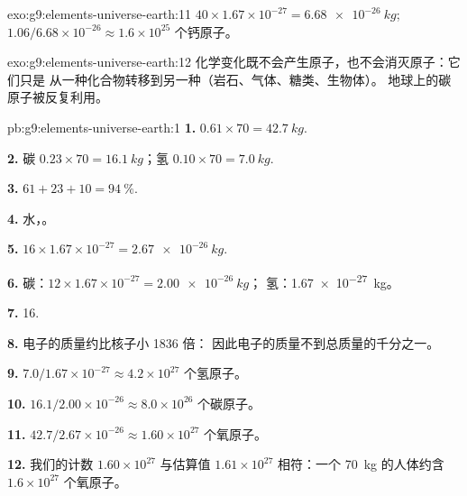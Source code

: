 \begin{solution}{exo:g9:elements-universe-earth:11}
$40 \times 1.67 \times 10^{-27} = \qty{6.68e-26}{kg}$;
$1.06 / 6.68 \times 10^{-26} \approx 1.6 \times 10^{25}$ 个钙原子。
\end{solution}

\begin{solution}{exo:g9:elements-universe-earth:12}
化学变化既不会产生原子，也不会消灭原子：它们只是
从一种化合物转移到另一种（岩石、气体、糖类、生物体）。
地球上的碳原子被反复利用。
\end{solution}

\begin{solution}{pb:g9:elements-universe-earth:1}
\textbf{1.} $0.61 \times 70 = \qty{42.7}{kg}$.

\textbf{2.} 碳 $0.23 \times 70 = \qty{16.1}{kg}$；氢
$0.10 \times 70 = \qty{7.0}{kg}$.

\textbf{3.} $61 + 23 + 10 = \qty{94}{\percent}$.

\textbf{4.} 水，。

\textbf{5.} $16 \times 1.67 \times 10^{-27} = \qty{2.67e-26}{kg}$.

\textbf{6.} 碳：$12 \times 1.67 \times 10^{-27} = \qty{2.00e-26}{kg}$；
氢：\qty{1.67e-27}{kg}。

\textbf{7.} 16.

\textbf{8.} 电子的质量约比核子小 1836 倍：
因此电子的质量不到总质量的千分之一。

\textbf{9.} $7.0 / 1.67 \times 10^{-27} \approx 4.2 \times 10^{27}$
个氢原子。

\textbf{10.} $16.1 / 2.00 \times 10^{-26} \approx 8.0 \times 10^{26}$
个碳原子。

\textbf{11.} $42.7 / 2.67 \times 10^{-26} \approx 1.60 \times 10^{27}$
个氧原子。

\textbf{12.} 我们的计数 $1.60 \times 10^{27}$ 与估算值
$1.61 \times 10^{27}$ 相符：一个 \qty{70}{kg} 的人体约含 $1.6 \times
10^{27}$ 个氧原子。
\end{solution}
